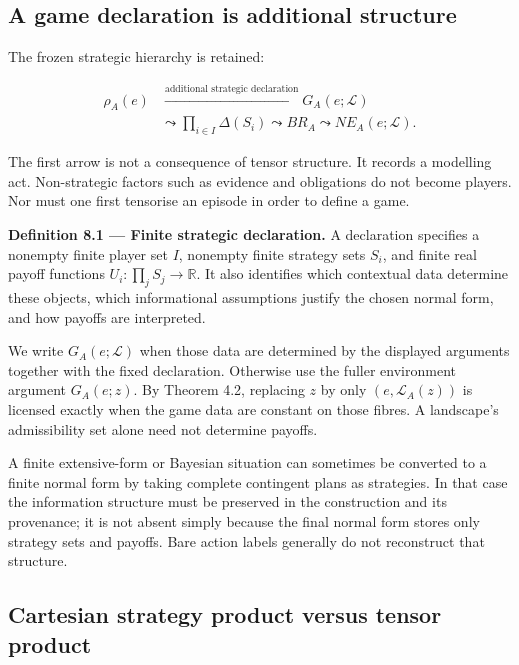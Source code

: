 \documentclass[11pt,a4paper]{article}
\begin{document}
\subsection{A game declaration is additional
structure}\label{a-game-declaration-is-additional-structure}

The frozen strategic hierarchy is retained:

\nopagebreak[4]

\[
\begin{aligned}
\rho_A(e)
&\xrightarrow{\text{additional strategic declaration}}
G_A(e;\mathcal L)\\
&\leadsto\prod_{i\in I}\Delta(S_i)
\leadsto BR_A
\leadsto NE_A(e;\mathcal L).
\end{aligned}
\]

The first arrow is not a consequence of tensor structure. It records a
modelling act. Non-strategic factors such as evidence and obligations do
not become players. Nor must one first tensorise an episode in order to
define a game.


\textbf{Definition 8.1 --- Finite strategic declaration.} A declaration
specifies a nonempty finite player set \(I\), nonempty finite strategy
sets \(S_i\), and finite real payoff functions
\(U_i:\prod_jS_j\to\mathbb R\). It also identifies which contextual data
determine these objects, which informational assumptions justify the
chosen normal form, and how payoffs are interpreted.

We write \(G_A(e;\mathcal L)\) when those data are determined by the
displayed arguments together with the fixed declaration. Otherwise use
the fuller environment argument \(G_A(e;z)\). By Theorem 4.2, replacing
\(z\) by only \((e,\mathcal L_A(z))\) is licensed exactly when the game
data are constant on those fibres. A landscape's admissibility set alone
need not determine payoffs.

A finite extensive-form or Bayesian situation can sometimes be converted
to a finite normal form by taking complete contingent plans as
strategies. In that case the information structure must be preserved in
the construction and its provenance; it is not absent simply because the
final normal form stores only strategy sets and payoffs. Bare action
labels generally do not reconstruct that structure.

\subsection{Cartesian strategy product versus tensor
product}\label{cartesian-strategy-product-versus-tensor-product}
\end{document}
